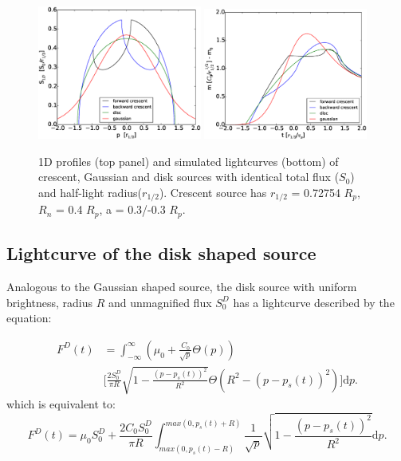 \documentclass[usenatbib]{mn2e}
\begin{document}
\begin{figure}
\centering
    \includegraphics[width = 0.48\textwidth]{figures/S1D_all.eps}
    \includegraphics[width = 0.48\textwidth]{figures/4source_magnification.eps}
\caption{\label{fig:lightcurve_gauss} 1D profiles (top panel) and simulated lightcurves (bottom) of crescent, Gaussian and disk sources with identical total flux ($S_0$) and half-light radius($r_{1/2}$). Crescent source has $r_{1/2}$ = 0.72754 $R_p$, $R_n$ = 0.4 $R_p$, a = 0.3/-0.3 $R_p$. }
\end{figure}


\subsection{Lightcurve of the disk shaped source}

Analogous to the Gaussian shaped source, the disk source with uniform brightness, radius $R$ and 
unmagnified flux $S_0^D$ has a lightcurve described by the equation:

\begin{equation}
\begin{aligned}
 F^D(t) &= \int_{-\infty}^\infty  \left( \mu_0 + \frac{C_0}{\sqrt{p}} \Theta \left( p \right) \right) \\
    & \bigg[ \frac{2 S_0^D}{ \pi R} \sqrt{1 - \frac{\left( p-p_s(t) \right)^2}{R^2}}  \Theta \left(R^2 - \left(p-p_s(t) \right)^2 \right) \bigg] \mathrm{d}p.
\end{aligned}
\end{equation}
which is equivalent to:
\begin{equation}
 F^D(t) = \mu_0 S_0^D + \frac{2 C_0 S_0^D}{\pi R} \int_{max(0, p_s(t) - R)}^{max(0, p_s(t) + R)} \frac{1}{\sqrt{p}} \sqrt{1 - \frac{\left( p-p_s(t) \right)^2}{R^2}} \mathrm{d}p.
\end{equation}
\end{document}
